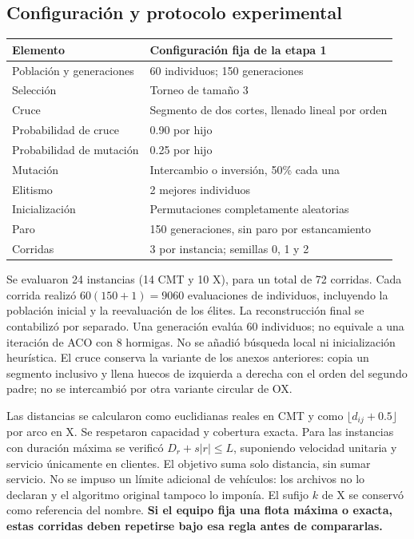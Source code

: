 \subsection{Configuración y protocolo experimental}
\begin{center}
\begin{tabular}{ll}\toprule
Elemento & Configuración fija de la etapa 1 \\\midrule
Población y generaciones & 60 individuos; 150 generaciones \\
Selección & Torneo de tamaño 3 \\
Cruce & Segmento de dos cortes, llenado lineal por orden \\
Probabilidad de cruce & 0.90 por hijo \\
Probabilidad de mutación & 0.25 por hijo \\
Mutación & Intercambio o inversión, 50\% cada una \\
Elitismo & 2 mejores individuos \\
Inicialización & Permutaciones completamente aleatorias \\
Paro & 150 generaciones, sin paro por estancamiento \\
Corridas & 3 por instancia; semillas 0, 1 y 2 \\\bottomrule
\end{tabular}
\end{center}
Se evaluaron 24 instancias (14 CMT y 10 X), para un total de 72 corridas.
Cada corrida realizó $60(150+1)=9060$ evaluaciones de individuos, incluyendo
la población inicial y la reevaluación de los élites. La reconstrucción final
se contabilizó por separado. Una generación evalúa 60 individuos; no equivale
a una iteración de ACO con 8 hormigas. No se añadió búsqueda local ni inicialización
heurística. El cruce conserva la variante de los anexos anteriores: copia un
segmento inclusivo y llena huecos de izquierda a derecha con el orden del
segundo padre; no se intercambió por otra variante circular de OX.

Las distancias se calcularon como euclidianas reales en CMT y como
$\lfloor d_{ij}+0.5\rfloor$ por arco en X. Se respetaron capacidad y cobertura
exacta. Para las instancias con duración máxima se verificó
$D_r+s|r|\leq L$, suponiendo velocidad unitaria y servicio únicamente en clientes.
El objetivo suma solo distancia, sin sumar servicio. No se impuso un límite
adicional de vehículos: los archivos no lo declaran y el algoritmo original
tampoco lo imponía. El sufijo $k$ de X se conservó como referencia del nombre.
\textbf{Si el equipo fija una flota máxima o exacta, estas corridas deben
repetirse bajo esa regla antes de compararlas.}

